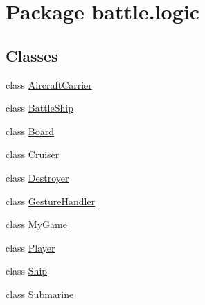 \hypertarget{namespacebattle_1_1logic}{}\section{Package battle.\+logic}
\label{namespacebattle_1_1logic}
\subsection*{Classes}
\begin{DoxyCompactItemize}
\item 
class \hyperlink{classbattle_1_1logic_1_1_aircraft_carrier}{Aircraft\+Carrier}
\item 
class \hyperlink{classbattle_1_1logic_1_1_battle_ship}{Battle\+Ship}
\item 
class \hyperlink{classbattle_1_1logic_1_1_board}{Board}
\item 
class \hyperlink{classbattle_1_1logic_1_1_cruiser}{Cruiser}
\item 
class \hyperlink{classbattle_1_1logic_1_1_destroyer}{Destroyer}
\item 
class \hyperlink{classbattle_1_1logic_1_1_gesture_handler}{Gesture\+Handler}
\item 
class \hyperlink{classbattle_1_1logic_1_1_my_game}{My\+Game}
\item 
class \hyperlink{classbattle_1_1logic_1_1_player}{Player}
\item 
class \hyperlink{classbattle_1_1logic_1_1_ship}{Ship}
\item 
class \hyperlink{classbattle_1_1logic_1_1_submarine}{Submarine}
\end{DoxyCompactItemize}
